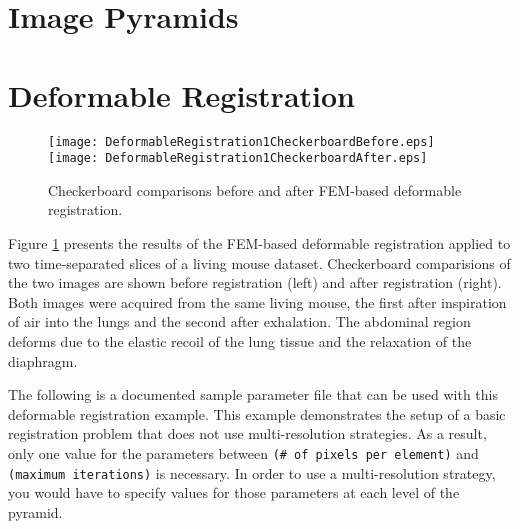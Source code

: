 \section{Image Pyramids}
\label{sec:ImagePyramids}



\section{Deformable Registration}
\label{sec:DeformableRegistration}


 
\begin{figure} \center
\texttt{[image: DeformableRegistration1CheckerboardBefore.eps]}
\texttt{[image: DeformableRegistration1CheckerboardAfter.eps]}
\caption{Checkerboard comparisons before and after FEM-based deformable registration.}
\label{fig:DeformableRegistration1Output}
\end{figure}

Figure \ref{fig:DeformableRegistration1Output} presents the results of
the FEM-based deformable registration applied to two time-separated
slices of a living mouse dataset.  Checkerboard comparisions of the
two images are shown before registration (left) and after registration
(right).  Both images were acquired from the same living mouse, the
first after inspiration of air into the lungs and the second after
exhalation.  The abdominal region deforms due to the elastic recoil of
the lung tissue and the relaxation of the diaphragm.

The following is a documented sample parameter file that can be used with this
deformable registration example.  This example demonstrates the setup of a
basic registration problem that does not use multi-resolution strategies.  As a
result, only one value for the parameters between \texttt{(\# of pixels per
element)} and \texttt{(maximum iterations)} is necessary.  In order to use a
multi-resolution strategy, you would have to specify values for those
parameters at each level of the pyramid.



